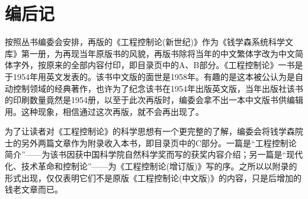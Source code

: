 
\chapter*{编后记}

按照丛书编委会安排，再版的《工程控制论(新世纪)》作为《钱学森系统科学文库》第一册，为再现当年原版书的风貌，再版书除将当年的中文繁体字改为中文简体字外，按原来的全部内容付印，即目录页中的A、B部分。《工程控制论》一书是于1954年用英文发表的。该书中文版的面世是1958年。有趣的是这本被公认为是自动控制领域的经典著作，也许为了纪念该书在1954年出版英文版，当年出版社该书的印刷数量竟然是1954册，以至于此次再版时，编委会拿不出一本中文版书供编辑用。这种现象，相信通过这次再版，就不会再出现了。

为了让读者对《工程控制论》的科学思想有一个更完整的了解，编委会将钱学森院士的另外两篇文章作为附录收入本书，即目录页中的C部分。一篇是“工程控制论简介”——为该书因获中国科学院自然科学奖而写的获奖内容介绍；另一篇是“现代化、技术革命和控制论”——为《工程控制论(增订版)》写的序。之所以以附录的形式出现，仅仅表明它们不是原版《工程控制论(中文版)》的内容，只是后增加的钱老文章而已。
